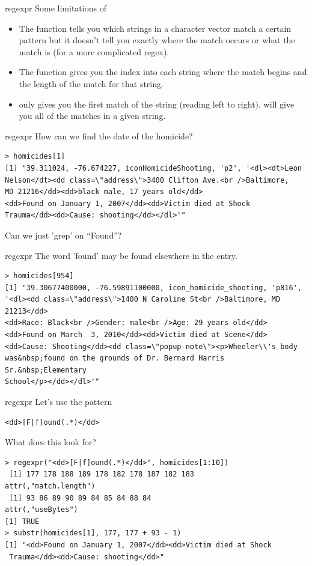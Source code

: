 \documentclass[aspectratio=169]{beamer}
\begin{document}
\begin{frame}[fragile]{regexpr}
Some limitations of 
\begin{itemize}
\item  The  function tells you which strings in a character
  vector match a certain pattern but it doesn't tell you exactly where
  the match occurs or what the match is (for a more complicated
  regex). 
\item The  function gives you the index into each string
  where the match begins and the length of the match for that string.
\item {} only gives you the first match of the string
  (reading left to right).  will give you all of the
  matches in a given string.
\end{itemize}
\end{frame}


\begin{frame}[fragile]{regexpr}
How can we find the date of the homicide?
\begin{verbatim}
> homicides[1]
[1] "39.311024, -76.674227, iconHomicideShooting, 'p2', '<dl><dt>Leon
Nelson</dt><dd class=\"address\">3400 Clifton Ave.<br />Baltimore, 
MD 21216</dd><dd>black male, 17 years old</dd>
<dd>Found on January 1, 2007</dd><dd>Victim died at Shock 
Trauma</dd><dd>Cause: shooting</dd></dl>'"
\end{verbatim}
Can we just 'grep' on ``Found''?
\end{frame}

\begin{frame}[fragile]{regexpr}
The word 'found' may be found elsewhere in the entry.
\begin{verbatim}
> homicides[954]
[1] "39.30677400000, -76.59891100000, icon_homicide_shooting, 'p816', 
'<dl><dd class=\"address\">1400 N Caroline St<br />Baltimore, MD 21213</dd>
<dd>Race: Black<br />Gender: male<br />Age: 29 years old</dd>
<dd>Found on March  3, 2010</dd><dd>Victim died at Scene</dd>
<dd>Cause: Shooting</dd><dd class=\"popup-note\"><p>Wheeler\\'s body 
was&nbsp;found on the grounds of Dr. Bernard Harris Sr.&nbsp;Elementary 
School</p></dd></dl>'"
\end{verbatim}
\end{frame}

\begin{frame}[fragile]{regexpr}
Let's use the pattern
\begin{verbatim}
<dd>[F|f]ound(.*)</dd>
\end{verbatim}
What does this look for?
\begin{verbatim}
> regexpr("<dd>[F|f]ound(.*)</dd>", homicides[1:10])
 [1] 177 178 188 189 178 182 178 187 182 183
attr(,"match.length")
 [1] 93 86 89 90 89 84 85 84 88 84
attr(,"useBytes")
[1] TRUE
> substr(homicides[1], 177, 177 + 93 - 1)
[1] "<dd>Found on January 1, 2007</dd><dd>Victim died at Shock
 Trauma</dd><dd>Cause: shooting</dd>"
\end{verbatim}
\end{frame}
\end{document}
